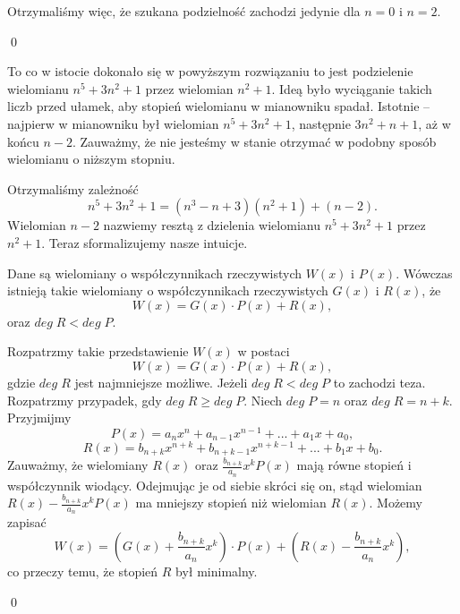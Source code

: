 \vspace{5px}

\noindent
Otrzymaliśmy więc, że szukana podzielność zachodzi jedynie dla $n = 0$ i $n = 2$.

\qed

\noindent 
To co w istocie dokonało się w powyższym rozwiązaniu to jest podzielenie wielomianu $n^5 + 3n^2 + 1$ przez wielomian $n^2 + 1$. Ideą było wyciąganie takich liczb przed ułamek, aby stopień wielomianu w mianowniku spadał. Istotnie -- najpierw w mianowniku był wielomian $n^5 + 3n^2 + 1$, następnie $3n^2 + n + 1$, aż w końcu $n - 2$. Zauważmy, że nie jesteśmy w stanie otrzymać w podobny sposób wielomianu o niższym stopniu.

\vspace{5px}
\noindent
Otrzymaliśmy zależność
\[
    n^5 + 3n^2 + 1 = (n^3 - n + 3)(n^2 + 1) + (n - 2).
\]
Wielomian $n - 2$ nazwiemy resztą z dzielenia wielomianu $n^5 + 3n^2 + 1$ przez $n^2 + 1$. Teraz sformalizujemy nasze intuicje.

\vspace{5px}


\noindent
Dane są wielomiany o współczynnikach rzeczywistych $W(x)$ i $P(x)$. Wówczas istnieją takie wielomiany o współczynnikach rzeczywistych $G(x)$ i $R(x)$, że
\[
    W(x) = G(x) \cdot P(x) + R(x),
\]
oraz $deg \; R < deg\; P$. 

\vspace{10px}


\noindent
Rozpatrzmy takie przedstawienie $W(x)$ w postaci
\[
    W(x) = G(x) \cdot P(x) + R(x),
\]
gdzie $deg \; R$ jest najmniejsze możliwe. Jeżeli $deg \; R < deg\; P$ to zachodzi teza. Rozpatrzmy przypadek, gdy $deg \; R \geqslant deg\; P$. Niech $deg \; P = n$ oraz $deg \; R = n + k$. Przyjmijmy
\[
    P(x) =  a_nx^n + a_{n - 1}x^{n - 1} + ... + a_1x + a_0,
\]
\[  
    R(x) = b_{n + k}x^{n + k} + b_{n + k - 1}x^{n + k - 1} + ... + b_1x + b_0.
\]
Zauważmy, że wielomiany $R(x)$ oraz $\frac{b_{n + k}}{a_n}x^kP(x)$ mają równe stopień i współczynnik wiodący. Odejmując je od siebie skróci się on, stąd wielomian $R(x) - \frac{b_{n + k}}{a_n}x^kP(x)$ ma mniejszy stopień niż wielomian $R(x)$. Możemy zapisać
\[
    W(x) = \left(G(x) + \frac{b_{n + k}}{a_n}x^k\right) \cdot  P(x) + \left(R(x) - \frac{b_{n + k}}{a_n}x^k\right),
\]
co przeczy temu, że stopień $R$ był minimalny.

\qed


